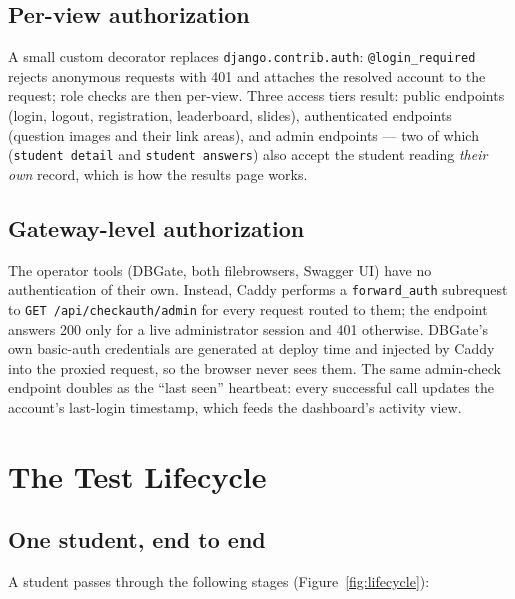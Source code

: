 \documentclass[11pt,a4paper]{article}
\newcommand{\code}[1]{\texttt{#1}}
\begin{document}
\subsection{Per-view authorization}

A small custom decorator replaces \code{django.contrib.auth}:
\code{@login\_required} rejects anonymous requests with 401 and
attaches the resolved account to the request; role checks are then
per-view. Three access tiers result: public endpoints (login, logout,
registration, leaderboard, slides), authenticated endpoints (question
images and their link areas), and admin endpoints --- two of which
(\code{student detail} and \code{student answers}) also accept the
student reading \emph{their own} record, which is how the results page
works.

\subsection{Gateway-level authorization}
\label{sec:gateway}

The operator tools (DBGate, both filebrowsers, Swagger UI) have no
authentication of their own. Instead, Caddy performs a
\code{forward\_auth} subrequest to
\code{GET /api/checkauth/admin} for every request routed to them; the
endpoint answers 200 only for a live administrator session and 401
otherwise. DBGate's own basic-auth credentials are generated at deploy
time and injected by Caddy into the proxied request, so the browser
never sees them. The same admin-check endpoint doubles as the ``last
seen'' heartbeat: every successful call updates the account's
last-login timestamp, which feeds the dashboard's activity view.

\section{The Test Lifecycle}
\label{sec:lifecycle}

\subsection{One student, end to end}

A student passes through the following stages
(Figure~\ref{fig:lifecycle}):
\end{document}
